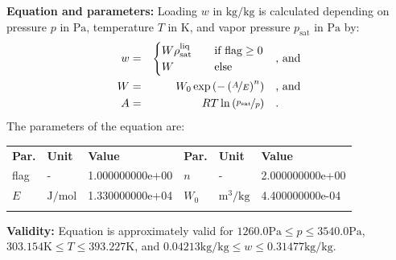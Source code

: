 \textbf{Equation and parameters:}
\newline
%
Loading $w$ in $\si{\kilogram\per\kilogram}$ is calculated depending on pressure $p$ in $\si{\pascal}$, temperature $T$ in $\si{\kelvin}$, and vapor pressure $p_\mathrm{sat}$ in $\si{\pascal}$ by:
%
\begin{equation*}
\begin{split}
w &=& \begin{cases} W \rho_\mathrm{sat}^{\mathrm{liq}} & \quad \text{if flag} \geq 0 \\ W & \quad \text{else} \end{cases} & \quad\text{, and} \\
W &=& W_0 \exp \left( - \left( \nicefrac{A}{E} \right) ^{n} \right) & \quad\text{, and} \\
A &=& R T \ln \left( \nicefrac{p_\mathrm{sat}}{p} \right) & \quad\text{.} \\
\end{split}
\end{equation*}
%
The parameters of the equation are:
%
\begin{longtable}[l]{lll|lll}
\toprule
\addlinespace
\textbf{Par.} & \textbf{Unit} & \textbf{Value} &	\textbf{Par.} & \textbf{Unit} & \textbf{Value} \\
\addlinespace
\midrule
\endhead

\bottomrule
\endfoot
\bottomrule
\endlastfoot
\addlinespace

flag & - & 1.000000000e+00 & $n$ & - & 2.000000000e+00 \\
$E$ & $\si{\joule\per\mole}$ & 1.330000000e+04 & $W_0$ & $\si{\cubic\meter\per\kilogram}$ & 4.400000000e-04 \\

\addlinespace\end{longtable}

\textbf{Validity:}
\newline
Equation is approximately valid for $1260.0 \si{\pascal} \leq p \leq 3540.0 \si{\pascal}$,  $303.154 \si{\kelvin} \leq T \leq 393.227 \si{\kelvin}$, and $0.04213 \si{\kilogram\per\kilogram} \leq w \leq 0.31477 \si{\kilogram\per\kilogram}$.
\newline

